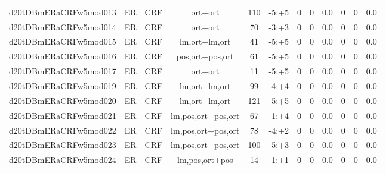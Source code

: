 \documentclass[a4paper]{article}
\begin{document}
\begin{landscape}
\begin{center}
\begin{tabular}{ |c|c|c|c|c|c|c|c|c|c|c|c|}
 
 	
 	\small{ d20tDBmERaCRFw5mod013 } & ER & CRF & ort+ort  &  110 &  -5:+5  &  0 & 0 & 0.0  &  0 & 0 & 0.0 \\
 	

 
 	
 	\small{ d20tDBmERaCRFw5mod014 } & ER & CRF & ort+ort  &  70 &  -3:+3  &  0 & 0 & 0.0  &  0 & 0 & 0.0 \\
 	

 
 	
 	\small{ d20tDBmERaCRFw5mod015 } & ER & CRF & lm,ort+lm,ort  &  41 &  -5:+5  &  0 & 0 & 0.0  &  0 & 0 & 0.0 \\
 	

 
 	
 	\small{ d20tDBmERaCRFw5mod016 } & ER & CRF & pos,ort+pos,ort  &  61 &  -5:+5  &  0 & 0 & 0.0  &  0 & 0 & 0.0 \\
 	

 
 	
 	\small{ d20tDBmERaCRFw5mod017 } & ER & CRF & ort+ort  &  11 &  -5:+5  &  0 & 0 & 0.0  &  0 & 0 & 0.0 \\
 	

 
 	
 	\small{ d20tDBmERaCRFw5mod019 } & ER & CRF & lm,ort+lm,ort  &  99 &  -4:+4  &  0 & 0 & 0.0  &  0 & 0 & 0.0 \\
 	

 
 	
 	\small{ d20tDBmERaCRFw5mod020 } & ER & CRF & lm,ort+lm,ort  &  121 &  -5:+5  &  0 & 0 & 0.0  &  0 & 0 & 0.0 \\
 	

 
 	
 	\small{ d20tDBmERaCRFw5mod021 } & ER & CRF & lm,pos,ort+pos,ort  &  67 &  -1:+4  &  0 & 0 & 0.0  &  0 & 0 & 0.0 \\
 	

 
 	
 	\small{ d20tDBmERaCRFw5mod022 } & ER & CRF & lm,pos,ort+pos,ort  &  78 &  -4:+2  &  0 & 0 & 0.0  &  0 & 0 & 0.0 \\
 	

 
 	
 	\small{ d20tDBmERaCRFw5mod023 } & ER & CRF & lm,pos,ort+pos,ort  &  100 &  -5:+3  &  0 & 0 & 0.0  &  0 & 0 & 0.0 \\
 	

 
 	
 	\small{ d20tDBmERaCRFw5mod024 } & ER & CRF & lm,pos,ort+pos  &  14 &  -1:+1  &  0 & 0 & 0.0  &  0 & 0 & 0.0 \\
 	


\end{tabular}
\end{center}
\end{landscape}
\end{document}
